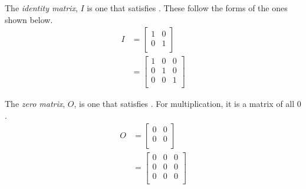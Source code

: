 \begin{definition}\label{def:Multiplicative_Identity_Matrix}
  The \emph{identity matrix}, $I$ is one that satisfies .
  These follow the forms of the ones shown below.
  \begin{equation}\label{eq:Multiplicative_Identity_Matrix}
    \begin{aligned}
      I &=
      \begin{bmatrix}
        1 & 0 \\
        0 & 1 \\
      \end{bmatrix} \\
      &=
      \begin{bmatrix}
        1 & 0 & 0 \\
        0 & 1 & 0 \\
        0 & 0 & 1 \\
      \end{bmatrix}
    \end{aligned}
  \end{equation}
\end{definition}

\begin{definition}\label{def:Zero_Matrix}
  The \emph{zero matrix}, $O$, is one that satisfies .
  For  multiplication, it is a matrix of all $0$.
  \begin{equation}
    \label{eq:3}
    \begin{aligned}
      O &=
      \begin{bmatrix}
        0 & 0 \\
        0 & 0 \\
      \end{bmatrix} \\
      &=
      \begin{bmatrix}
        0 & 0 & 0 \\
        0 & 0 & 0 \\
        0 & 0 & 0 \\
      \end{bmatrix}
    \end{aligned}
  \end{equation}
\end{definition}




